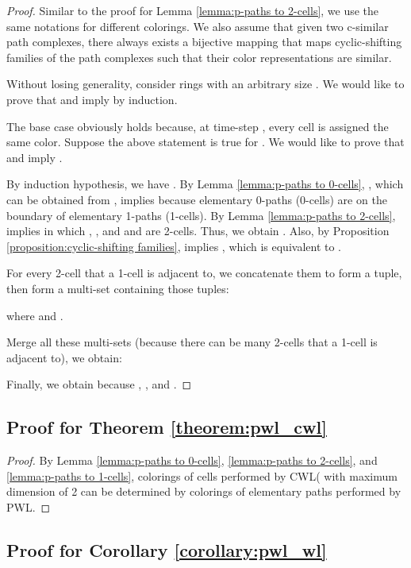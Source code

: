 \documentclass[letterpaper]{article} \usepackage{aaai24}  \usepackage{times}  \usepackage{helvet}  \usepackage{courier}  \usepackage[hyphens]{url}  \usepackage{graphicx} \urlstyle{rm} \def\UrlFont{\rm}  \usepackage{natbib}  \usepackage{caption} \frenchspacing  \setlength{\pdfpagewidth}{8.5in} \setlength{\pdfpageheight}{11in} \usepackage{algorithm}
\begin{document}
\begin{proof}
    Similar to the proof for Lemma \ref{lemma:p-paths to 2-cells}, we use the same notations for different colorings. We also assume that given two c-similar path complexes, there always exists a bijective mapping that maps cyclic-shifting families of the path complexes such that their color representations are similar.
    
    Without losing generality, consider rings with an arbitrary size . We would like to prove that  and  imply  by induction.
    
    The base case obviously holds because, at time-step , every cell is assigned the same color. Suppose the above statement is true for . We would like to prove that  and  imply .
    
    By induction hypothesis, we have . By Lemma \ref{lemma:p-paths to 0-cells}, , which can be obtained from , implies  because elementary 0-paths (0-cells) are on the boundary of elementary 1-paths (1-cells). By Lemma \ref{lemma:p-paths to 2-cells},  implies   in which , , and  and  are 2-cells. Thus, we obtain . Also, by Proposition \ref{proposition:cyclic-shifting families},  implies , which is equivalent to .

    For every 2-cell that a 1-cell is adjacent to, we concatenate them to form a tuple, then form a multi-set containing those tuples:

where  and .

    Merge all these multi-sets (because there can be many 2-cells that a 1-cell is adjacent to), we obtain:
    
  Finally, we obtain  because , , and .
    
\end{proof}
\subsection{Proof for Theorem \ref{theorem:pwl_cwl}}


\begin{proof}
    By Lemma \ref{lemma:p-paths to 0-cells}, \ref{lemma:p-paths to 2-cells}, and \ref{lemma:p-paths to 1-cells}, colorings of cells performed by CWL( with maximum dimension of 2 can be determined by colorings of elementary paths performed by PWL.
\end{proof}


\subsection{Proof for Corollary \ref{corollary:pwl_wl}}
\end{document}
